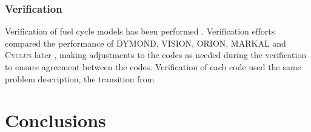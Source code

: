 \documentclass{article}
\newcommand{\Cyclus}{\textsc{Cyclus}\xspace}%
\begin{document}
    \subsubsection{Verification}

    Verification of fuel cycle models has been performed
    \cite{feng_standardized_2016,bae_standardized_2019}. Verification efforts
    compared the performance of DYMOND, VISION, ORION, MARKAL 
    \cite{feng_standardized_2016} and \Cyclus later \cite{bae_standardized_2019}, 
    making adjustments to the codes as needed
    during the verification to ensure agreement between the codes. Verification 
    of each code used the same problem description, the transition from 


    

    \section{Conclusions}

% 

   
\end{document}
